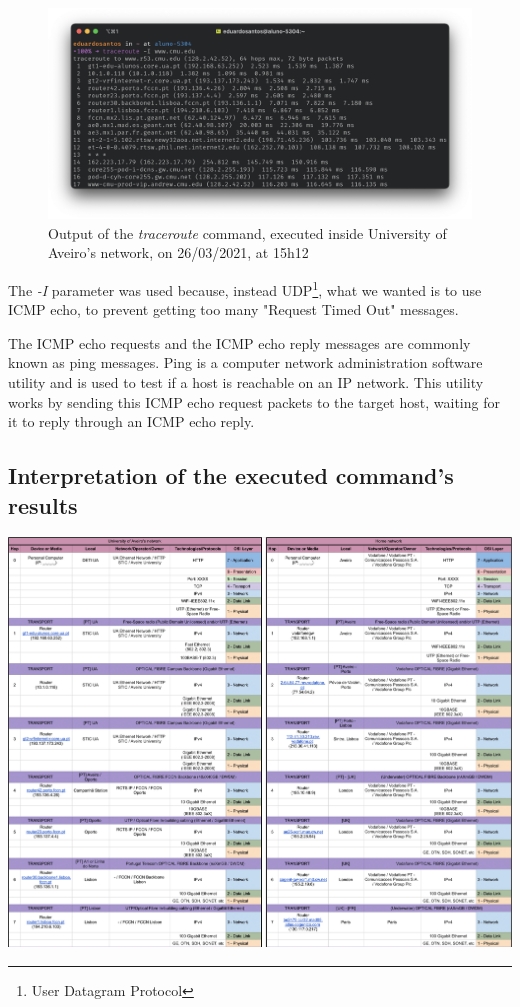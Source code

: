 \documentclass{article}
\begin{document}
\begin{figure}[H]
    \includegraphics[width=1 \textwidth]{images/tracerouteUA.png}
    \caption{Output of the \textit{traceroute} command, executed inside University of Aveiro's network, on 26/03/2021, at 15h12}
    \label{tracerouteUA}
\end{figure}


The \textit{-I} parameter was used because, instead UDP\footnote{User Datagram Protocol}, what we wanted is to use ICMP echo, to prevent getting too many "Request Timed Out" messages. 

The ICMP echo requests and the ICMP echo reply messages are commonly known as ping messages. Ping is a computer network administration software utility and is used to test if a host is reachable on an IP network. This utility works by sending this ICMP echo request packets to the target host, waiting for it to reply through an ICMP echo reply.

\subsection{Interpretation of the executed command's results}

\vspace*{\fill}
    \begin{center}
        \includegraphics[width=1 \textwidth]{images/traceroute_part1.png}
    \end{center}
\vspace*{\fill}
\end{document}
